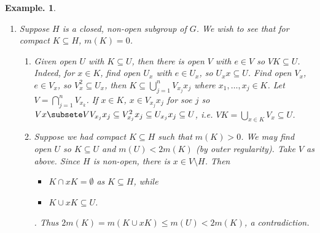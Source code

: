 \documentclass[11pt, a4paper]{memoir}
\theoremstyle{change}
\theoremstyle{plain}
\theoremstyle{nonumberplain}
\newtheorem{example}{Example.}
\numberwithin{equation}{section}
\begin{document}
\begin{example}
\begin{enumerate}[nl,r]
\begin{align*}
                \{t\in T:U\cap tH\neq\emptyset\} &= \{t\in T:M(U\cap tH)>0\}\\
                                                 &= \bigcup_{n=1}^\infty\{t\in T:m(U\cap tH)<\frac{1}{n}\}
            \end{align*}
            is countable, so if $E\in\mathcal{B}(G)$, $m(E)<\infty$, $E\subseteq\bigcup_{j=1}^\infty t_jH$ and then
            \begin{align*}
                m(E)&=\sum_{j=1}^\infty m(E\cap t_jH)=\sum_{j=1}^\infty m(t_j^{-1}(E\cap t_j H))\\
                    &=\sum_{j=1}^\infty m_H((t_j^{-1}E)\cap H)
            \end{align*}
        \item Suppose $H$ is a closed, non-open subgroup of $G$.
            We wish to see that for compact $K\subseteq H$, $m(K)=0$.
            \begin{enumerate}[nl,a]
                \item Given open $U$ with $K\subseteq U$, then there is open $V$ with $e\in V$ so $VK\subseteq U$.
                    Indeed, for $x\in K$, find open $U_x$ with $e\in U_x$, so $U_xx\subseteq U$.
                    Find open $V_x$, $e\in V_x$, so $V_x^2\subseteq U_x$, then $K\subseteq\bigcup_{j=1}^n V_{x_j}x_j$ where $x_1,\ldots,x_j\in K$.
                    Let $V=\bigcap_{j=1}^n V_{x_k}$.
                    If $x\in K$, $x\in V_{x_j}x_j$ for soe $j$ so $Vx\subsete VV_{x_j}x_j\subseteq V_{x_j}^2x_j\subseteq U_{x_j}x_j\subseteq U$, i.e. $VK=\bigcup_{x\in K}V_x\subseteq U$.
                \item Suppose we had compact $K\subseteq H$ such that $m(K)>0$.
                    We may find open $U$ so $K\subseteq U$ and $m(U)<2m(K)$ (by outer regularity).
                    Take $V$ as above.
                    Since $H$ is non-open, there is $x\in V\setminus H$.
                    Then
                    \begin{itemize}[nl]
                        \item $K\cap xK=\emptyset$ as $K\subseteq H$, while
                        \item $K\cup xK\subseteq U$.
                    \end{itemize}.
                    Thus $2m(K)=m(K\cup xK)\leq m(U)<2m(K)$, a contradiction.


\end{enumerate}
\end{enumerate}
\end{example}
\end{document}
